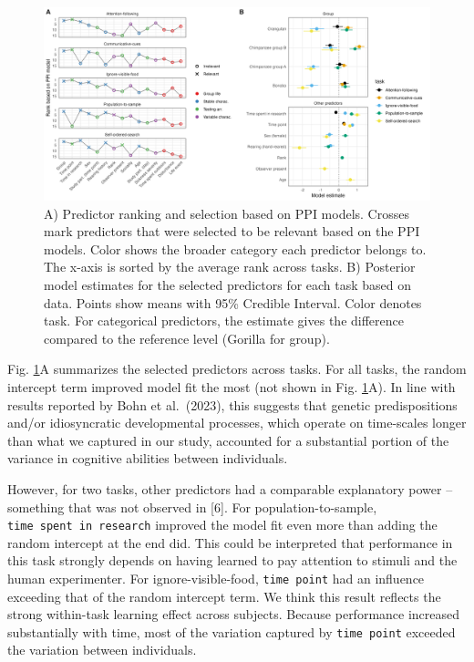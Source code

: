 \documentclass[
  man,floatsintext]{apa6}
\begin{document}
\begin{figure}

{\centering \includegraphics[width=1\linewidth]{../visuals/pred_sum} 

}

\caption{A) Predictor ranking and selection based on PPI models. Crosses mark predictors that were selected to be relevant based on the PPI models. Color shows the broader category each predictor belongs to. The x-axis is sorted by the average rank across tasks. B) Posterior model estimates for the selected predictors for each task based on data. Points show means with 95\% Credible Interval. Color denotes task. For categorical predictors, the estimate gives the difference compared to the reference level (Gorilla for group).}\label{fig:figpred}
\end{figure}

Fig. \ref{fig:figpred}A summarizes the selected predictors across tasks. For all tasks, the random intercept term improved model fit the most (not shown in Fig. \ref{fig:figpred}A). In line with results reported by Bohn et al.~(2023), this suggests that genetic predispositions and/or idiosyncratic developmental processes, which operate on time-scales longer than what we captured in our study, accounted for a substantial portion of the variance in cognitive abilities between individuals.

However, for two tasks, other predictors had a comparable explanatory power -- something that was not observed in {[}6{]}. For population-to-sample, \texttt{time\ spent\ in\ research} improved the model fit even more than adding the random intercept at the end did. This could be interpreted that performance in this task strongly depends on having learned to pay attention to stimuli and the human experimenter. For ignore-visible-food, \texttt{time\ point} had an influence exceeding that of the random intercept term. We think this result reflects the strong within-task learning effect across subjects. Because performance increased substantially with time, most of the variation captured by \texttt{time\ point} exceeded the variation between individuals.
\end{document}
